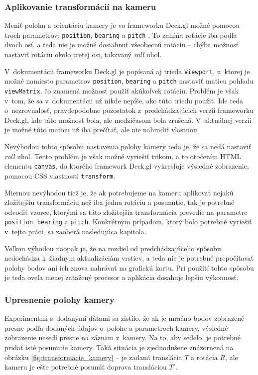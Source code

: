 \subsubsection{Aplikovanie transformácií na kameru}

Meniť polohu a orientáciu kamery je vo frameworku Deck.gl možné pomocou troch parametrov: \texttt{position}, \texttt{bearing} a \texttt{pitch} \cite{deck.gl_documentation}. To zahŕňa rotácie iba podľa dvoch osí, a teda nie je možné dosiahnuť všeobecnú rotáciu -- chýba možnosť nastaviť rotáciu okolo tretej osi, takzvaný \emph{roll} uhol.

V~dokumentácii frameworku Deck.gl je popísaná aj trieda \texttt{Viewport}, u~ktorej je možné namiesto parametrov \texttt{position}, \texttt{bearing} a \texttt{pitch} nastaviť maticu pohľadu \texttt{viewMatrix}, čo znamená možnosť použiť akúkoľvek rotáciu. Problém je však v~tom, že sa v~dokumentácii už nikde nepíše, ako túto triedu použiť. Ide teda o~nezrovnalosť, pravdepodobne pozostatok z~predchádzajúcich verzií frameworku Deck.gl, kde táto možnosť bola, ale medzičasom bola zrušená. V~aktuálnej verzii je možné túto maticu už iba prečítať, ale nie nahradiť vlastnou.

Nevýhodou tohto spôsobu nastavenia polohy kamery teda je, že sa nedá nastaviť \emph{roll} uhol. Tento problém je však možné vyriešiť trikom, a to otočením HTML elementu \texttt{canvas}, do ktorého framework Deck.gl vykresľuje výsledné zobrazenie, pomocou CSS vlastnosti \texttt{transform}. 

Miernou nevýhodou tiež je, že ak potrebujeme na kameru aplikovať nejakú zložitejšiu transformáciu než iba jednu rotáciu a posunutie, tak je potrebné odvodiť vzorce, ktorými sa táto zložitejšia transformácia prevedie na parametre \texttt{position}, \texttt{bearing} a \texttt{pitch}. Konkrétnym prípadom, ktorý bolo potrebné vyriešiť v~tejto práci, sa zaoberá nasledujúca kapitola.

Veľkou výhodou naopak je, že na rozdiel od predchádzajúceho spôsobu nedochádza k~žiadnym aktualizáciám vrstiev, a teda nie je potrebné prepočítavať polohy bodov ani ich znova nahrávať na grafickú kartu. Pri použití tohto spôsobu je teda oveľa menej zaťažený procesor a aplikácia dosahuje lepšiu výkonnosť.

\subsubsection{Upresnenie polohy kamery}

Experimentmi s~dodanými dátami sa zistilo, že ak je mračno bodov zobrazené presne podľa dodaných údajov o~polohe a parametroch kamery, výsledné zobrazenie nesedí presne na záznam z~kamery. Na to, aby sedelo, je potrebné pridať isté posunutie kamery. Taká situácia je zjednodušene znázornená na obrázku \ref{fig:transformacie_kamery} -- je zadaná translácia $T$ a rotácia $R$, ale kameru je ešte potrebné posunúť doprava transláciou $T'$.

